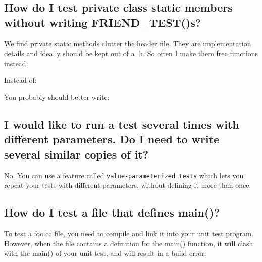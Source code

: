 \subsection*{How do I test private class static members without writing F\+R\+I\+E\+N\+D\+\_\+\+T\+E\+S\+T()s?}

We find private static methods clutter the header file. They are implementation details and ideally should be kept out of a .h. So often I make them free functions instead.

Instead of\+: 
\begin{DoxyCode}{0}
\DoxyCodeLine{\};}
\DoxyCodeLine{}
\DoxyCodeLine{}
\end{DoxyCode}


You probably should better write\+: 
\begin{DoxyCode}{0}
\DoxyCodeLine{\};}
\DoxyCodeLine{}
\DoxyCodeLine{\}}
\DoxyCodeLine{}
\DoxyCodeLine{\}}
\DoxyCodeLine{}
\end{DoxyCode}


\subsection*{I would like to run a test several times with different parameters. Do I need to write several similar copies of it?}

No. You can use a feature called \href{advanced.md#Value_Parameterized_Tests}{\tt value-\/parameterized tests} which lets you repeat your tests with different parameters, without defining it more than once.

\subsection*{How do I test a file that defines main()?}

To test a {\ttfamily foo.\+cc} file, you need to compile and link it into your unit test program. However, when the file contains a definition for the {\ttfamily main()} function, it will clash with the {\ttfamily main()} of your unit test, and will result in a build error.

